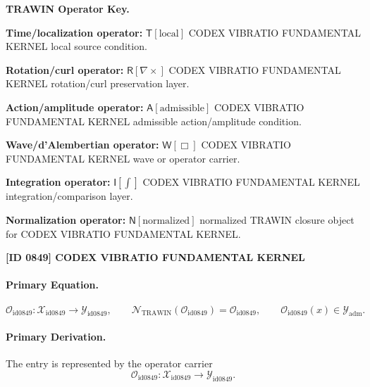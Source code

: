 \par\vspace{0.45\baselineskip}
\noindent\begin{minipage}[t]{\linewidth}
\begingroup
\small
\raggedright
\textbf{TRAWIN Operator Key.}\par
\noindent\textbf{Time/localization operator:} $\mathsf{T}\!\left[\mathrm{local}\right]$ CODEX VIBRATIO FUNDAMENTAL KERNEL local source condition.\par
\noindent\textbf{Rotation/curl operator:} $\mathsf{R}\!\left[\nabla\times\right]$ CODEX VIBRATIO FUNDAMENTAL KERNEL rotation/curl preservation layer.\par
\noindent\textbf{Action/amplitude operator:} $\mathsf{A}\!\left[\mathrm{admissible}\right]$ CODEX VIBRATIO FUNDAMENTAL KERNEL admissible action/amplitude condition.\par
\noindent\textbf{Wave/d'Alembertian operator:} $\mathsf{W}\!\left[\Box\right]$ CODEX VIBRATIO FUNDAMENTAL KERNEL wave or operator carrier.\par
\noindent\textbf{Integration operator:} $\mathsf{I}\!\left[\int\right]$ CODEX VIBRATIO FUNDAMENTAL KERNEL integration/comparison layer.\par
\noindent\textbf{Normalization operator:} $\mathsf{N}\!\left[\mathrm{normalized}\right]$ normalized TRAWIN closure object for CODEX VIBRATIO FUNDAMENTAL KERNEL.\par
\endgroup
\end{minipage}

\clearpage
\noindent\textbf{[ID 0849] CODEX VIBRATIO FUNDAMENTAL KERNEL}\par
\vspace{0.35em}
\paragraph{Primary Equation.}
\[
\mathcal{O}_{\mathrm{id0849}}:\mathcal{X}_{\mathrm{id0849}}\longrightarrow \mathcal{Y}_{\mathrm{id0849}},\qquad
\mathcal{N}_{\mathrm{TRAWIN}}(\mathcal{O}_{\mathrm{id0849}})=\mathcal{O}_{\mathrm{id0849}},\qquad
\mathcal{O}_{\mathrm{id0849}}(x)\in\mathcal{Y}_{\mathrm{adm}}.
\]

\paragraph{Primary Derivation.} The entry is represented by the operator carrier\[
\mathcal{O}_{\mathrm{id0849}}:\mathcal{X}_{\mathrm{id0849}}\longrightarrow \mathcal{Y}_{\mathrm{id0849}}.
\]

